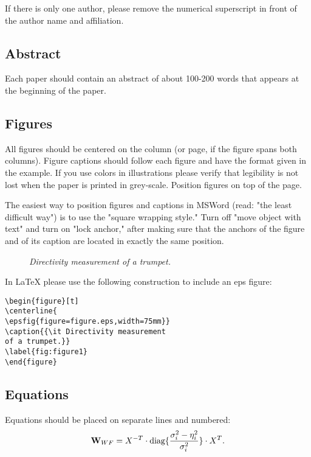 \documentclass{article}
\begin{document}
If there is only one author, please remove the numerical superscript
 in front of the author name and affiliation.  

\subsection{Abstract}
Each paper should contain an abstract of about 100-200 words that appears at the beginning of the paper.

\subsection{Figures}
All figures should be centered on the column (or page, if the figure
spans both columns). Figure captions should follow each figure and
have the format given in the example. If you use colors in
illustrations please verify that legibility is not lost when the paper
is printed in grey-scale. Position figures on top of the page. 

The easiest way to position figures and captions in MSWord (read: "the
least difficult way") is to use the "square wrapping style." Turn off
"move object with text" and turn on "lock anchor," after making sure
that the anchors of the figure and of its caption are located in
exactly the same position.  

\begin{figure}[t]
\centerline{}
\caption{{\it Directivity measurement of a trumpet.}}  
\label{fig:figure1}
\end{figure}

In LaTeX please use the following construction to include an eps figure:
\begin{verbatim}
\begin{figure}[t]
\centerline{
\epsfig{figure=figure.eps,width=75mm}}
\caption{{\it Directivity measurement 
of a trumpet.}}  
\label{fig:figure1}
\end{figure}
\end{verbatim}

\subsection{Equations}
Equations should be placed on separate lines and numbered: 
\begin{equation}
{\bf W}_{WF} = X^{-T} \cdot \textrm{diag} \{ \frac{\sigma_i^2-\eta_i^2}{\sigma_i^2} \} \cdot X^T.
\label{eq:equation1}
\end{equation}
\end{document}
